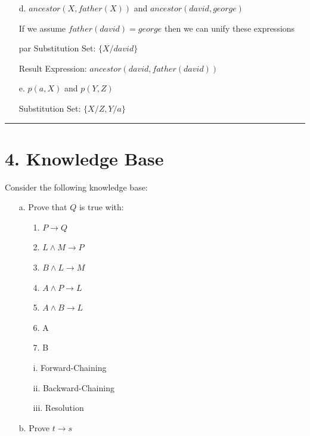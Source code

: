 \documentclass[11pt]{article}
\begin{document}
\begin{flushleft}
\begin{enumerate}
    \item[d.] $ancestor(X, father(X))$ and $ancestor(david, george)$ \par
        If we assume $father(david) = george$ then we can unify these
        expressions \par
                par
                                Substitution Set: $\{X/david\}$\par
        Result Expression: $ancestor(david, father(david))$

    \item[e.] $p(a, X)$ and $p(Y,Z)$ \par
        Substitution Set: $ \{X/Z, Y/a\} $

\end{enumerate}

\rule[0.1pt]{40em}{1.0pt}

\section*{4. Knowledge Base} Consider the following knowledge base:

\begin{enumerate}

    \item[a.] Prove that $Q$ is true with:

        \begin{enumerate}[leftmargin=8em]
            \item[1.] $P \rightarrow Q$
            \item[2.] $L \land M \rightarrow P$
            \item[3.] $B \land L \rightarrow M$
            \item[4.] $A \land P \rightarrow L$
            \item[5.] $A \land B \rightarrow L$
            \item[6.] A
            \item[7.] B
        \end{enumerate}

        \begin{enumerate}
            \item[i.] Forward-Chaining
            \item[ii.] Backward-Chaining
            \item[iii.] Resolution
        \end{enumerate}

    \item[b.] Prove $t \rightarrow s$


\end{enumerate}
\end{flushleft}
\end{document}
